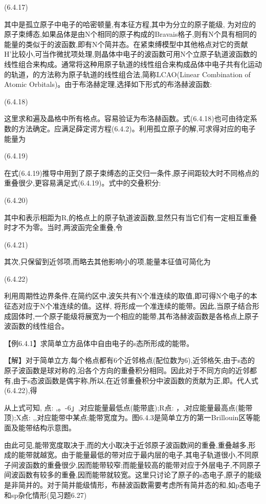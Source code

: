  	(6.4.17)

其中是孤立原子中电子的哈密顿量,有本征方程,其中为分立的原子能级, 为对应的原子束缚态,如果品体是由N个相同的原子构成的Bravais格子,则有N个具有相同的能量的类似于的波函数,即有N个简并态。在紧束缚模型中其他格点对它的贡献H'比较小,可当作微扰项处理,则晶体中电子的波函数可用N个立原子轨道波函数的线性组合来构成。通常将这种用原子轨道的线性组合来构成品体中电子共有化运动的轨道，的方法称为原子轨道的线性组合法,简称LCAO(Linear Combination of Atomic Orbitals)。由于布洛赫定理,选择如下形式的布洛赫波函数:

 	(6.4.18)

这里求和遍及晶格中所有格点。容易验证为布洛赫函数。式(6.4.18)也可由待定系数的方法确定。应满足薛定谔方程(6.4.2)。利用孤立原子的解,可求得对应的电子能量为

 	(6.4.19)

在式(6.4.19)推导中用到了原子束缚态的正交归一条件,原子间距较大时不同格点的重叠很少,更容易满足式(6.4.19)。式中的交叠积分:

 	(6.4.20)

其中和表示相距为R,的格点上的原子轨道波函数,显然只有当它们有一定相互重叠时才不为零。当时,两波函完全重叠,令

 	(6.4.21)

其次,只保留到近邻项,而略去其他影响小的项,能量本征值可简化为

 	(6.4.22)

利用周期性边界条件,在简约区中,波矢共有N个准连续的取值,即可得N个电子的本征态对应于N个准连续的值。这样, 将形成一个准连续的能带。因此,当原子结合形成固体时,一个原子能级将展宽为一个相应的能带,其布洛赫波函数是各格点上原子波函数的线性组合。

【例6.4.1】求简单立方品体中自由电子的s态所形成的能带。

【解】对于简单立方,每个格点都有6个近邻格点(配位数为6),近邻格矢,由于s态的原子波函数是球对称的,沿各个方向的重叠积分相同。因此对于不同方向的近邻都有,由于s态波函数是偶宇称,所以,在近邻重叠积分中波函数的贡献为正,即。代人式(6.4.22),得



从上式可知, 点: ,。-6」,对应能量最低点(能带底);R点: ，,对应能量最高点(能带顶);X点: ,,对应能带中某点;能带宽度为。图6.4.3是简单立方的第一Brillouin区等能面及能带结构示意图。



由此可见,能带宽度取决于,而的大小取决于近邻原子波函数间的重叠,重叠越多,形成的能带就越宽。由于能量最低的带对应于最内层的电子,其电子轨道很小,不同原子间波函数的重叠很少,因而能带较窄;而能量较高的能带对应于外层电子,不同原子间波函数有较多的重叠,因而能带就较宽。这里只讨论了原子的s态电子,原子的能级是非简并的。对于简并能级情形，布赫波函数需要考虑所有简并态的和,如p态电子和sp杂化情形(见习题6.27)





